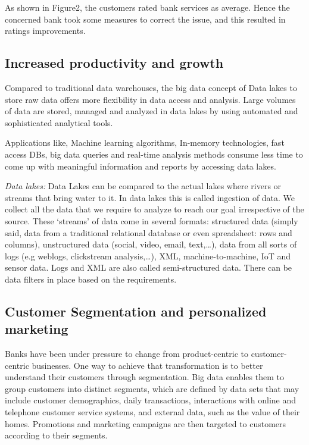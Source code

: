 \documentclass[sigconf]{acmart}
\begin{document}
As shown in Figure2, the customers rated bank services as average. Hence the concerned bank took some measures to correct the issue, and this resulted in ratings improvements.

\subsection{Increased productivity and growth}
Compared to traditional data warehouses, the big data concept of Data lakes to store raw data offers more flexibility in data access and analysis. Large volumes of data are stored, managed and analyzed in data lakes  by using automated and sophisticated analytical tools. 

Applications like, Machine learning algorithms, In-memory technologies, fast access DBs, big data queries and real-time analysis methods consume less time to come up with meaningful information and reports by accessing data lakes.

\textit{Data lakes:} Data Lakes can be compared to the actual lakes where rivers or streams that bring water to it. In data lakes this is called ingestion of data. We collect all the data that we require to analyze to reach our goal irrespective of the source. These ‘streams’ of data come in several formats: structured data (simply said, data from a traditional relational database or even spreadsheet: rows and columns), unstructured data (social, video, email, text,…), data from all sorts of logs (e.g weblogs, clickstream analysis,…), XML, machine-to-machine, IoT and sensor data. Logs and XML are also called semi-structured data. There can be data filters in place based on the requirements\cite{Data-lakes}.



\subsection{Customer Segmentation and personalized marketing}

Banks have been under pressure to change from product-centric to customer-centric businesses. One way to achieve that transformation is  to better understand their customers through segmentation. Big data enables them to  group customers into distinct segments, which are defined by data sets that may include customer demographics, daily transactions, interactions with online and telephone customer service systems, and external data, such as the value of their homes. Promotions and marketing campaigns are then targeted to customers according to their  segments\cite{5-big-data-use-cases-in-banking-and-financial-services}.
\end{document}
